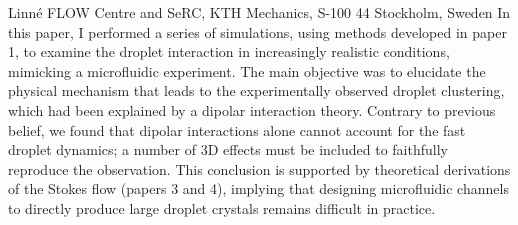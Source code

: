 %
%
%
%
%
%
%
\paperaffiliation
{%
  Linn\'e FLOW Centre and SeRC, KTH Mechanics, S-100 44 Stockholm, Sweden%
}%
%
%
%
%
%
\papernumber{}%
%
%
%
%
%
\papersummary%
{%
In this paper, I performed a series of simulations, using methods developed in paper 1, to examine the droplet interaction in increasingly realistic conditions, mimicking a microfluidic experiment. The main objective was to elucidate the physical mechanism that leads to the experimentally observed droplet clustering, which had been explained by a dipolar interaction theory. Contrary to previous belief, we found that dipolar interactions alone cannot account for the fast droplet dynamics; a number of 3D effects must be included to faithfully reproduce the observation. This conclusion is supported by theoretical derivations of the Stokes flow (papers 3 and 4), implying that designing microfluidic channels to directly produce large droplet crystals remains difficult in practice.
}%
%
\graphicspath{{paper2/}}%
%
%
%
